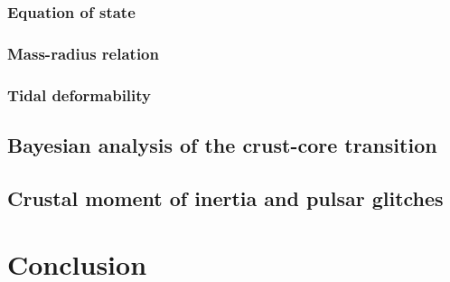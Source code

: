 \subsubsection{Equation of state} %

\subsubsection{Mass-radius relation} %

\subsubsection{Tidal deformability} %

\subsection{Bayesian analysis of the crust-core transition} %

\subsection{Crustal moment of inertia and pulsar glitches} %


\section{Conclusion} %
